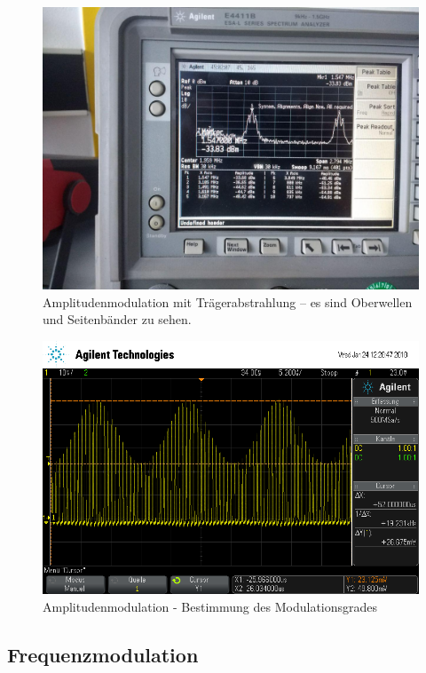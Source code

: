\begin{figure}
	\centering
	\includegraphics[width=\textwidth]{img/Aufgabenteil_c1.jpg}
	\caption{Amplitudenmodulation mit Trägerabstrahlung -- es sind Oberwellen und Seitenbänder zu sehen.}
	\label{c1}
\end{figure}

\begin{figure}
	\centering
	\includegraphics[width=\textwidth]{img/c_scope_247.png}
	\caption{Amplitudenmodulation - Bestimmung des Modulationsgrades}
	\label{c2}
\end{figure}

\subsection{Frequenzmodulation}

